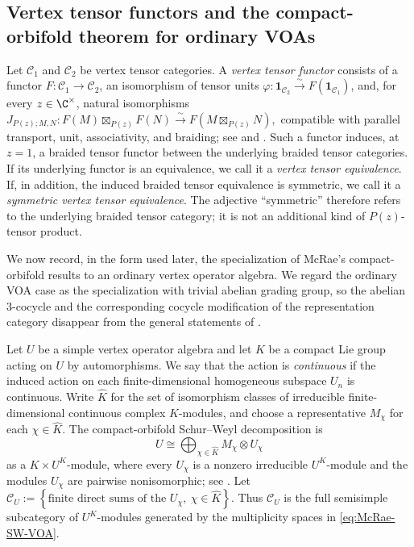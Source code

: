 \documentclass[12pt,leqno]{amsart}
\numberwithin{equation}{section} \newtheorem{thm}{Theorem}[section] \newtheorem{lem}[thm]{Lemma} \newtheorem{ex}[thm]{Example} \newtheorem{prop}[thm]{Proposition} \newtheorem{cor}[thm]{Corollary} \newtheorem{defi}[thm]{Definition} \newtheorem{rmk}[thm]{Remark} \newtheorem{notation}[thm]{Notation}
\begin{document}
\subsection{Vertex tensor functors and the compact-orbifold theorem for ordinary VOAs}
\label{subsec:McRae-VOA}

Let $\mathcal C_1$ and $\mathcal C_2$ be vertex tensor categories. A \emph{vertex tensor functor} consists of a functor $F:\mathcal C_1\to\mathcal C_2$, an isomorphism of tensor units \(\varphi:\mathbf 1_{\mathcal C_2}\overset{\sim}{\longrightarrow}F(\mathbf 1_{\mathcal C_1})\), and, for every $z\in\C^\times$, natural isomorphisms \(J_{P(z);M,N}:F(M)\boxtimes_{P(z)}F(N)\overset{\sim}{\longrightarrow}F(M\boxtimes_{P(z)}N),\) compatible with parallel transport, unit, associativity, and braiding; see \cite[\S2.1]{McRae} and \cite[\S3.6]{CKM}. Such a functor induces, at $z=1$, a braided tensor functor between the underlying braided tensor categories. If its underlying functor is an equivalence, we call it a \emph{vertex tensor equivalence}. If, in addition, the induced braided tensor equivalence is symmetric, we call it a \emph{symmetric vertex tensor equivalence}. The adjective ``symmetric'' therefore refers to the underlying braided tensor category; it is not an additional kind of $P(z)$-tensor product.

We now record, in the form used later, the specialization of McRae's compact-orbifold results to an ordinary vertex operator algebra. We regard the ordinary VOA case as the specialization with trivial abelian grading group, so the abelian $3$-cocycle and the corresponding cocycle modification of the representation category disappear from the general statements of \cite{McRae}.

Let $U$ be a simple vertex operator algebra and let $K$ be a compact Lie group acting on $U$ by automorphisms. We say that the action is \emph{continuous} if the induced action on each finite-dimensional homogeneous subspace $U_n$ is continuous. Write $\widehat K$ for the set of isomorphism classes of irreducible finite-dimensional continuous complex $K$-modules, and choose a representative $M_\chi$ for each $\chi\in\widehat K$. The compact-orbifold Schur--Weyl decomposition is
\begin{equation}\label{eq:McRae-SW-VOA}
 U\cong
 \bigoplus_{\chi\in\widehat K}M_\chi\otimes U_\chi
\end{equation}
as a $K\times U^K$-module, where every $U_\chi$ is a nonzero irreducible $U^K$-module and the modules $U_\chi$ are pairwise nonisomorphic; see \cite[\S3.1]{McRae}. Let \(\mathcal C_U:=\left\{\text{finite direct sums of the }U_\chi,\ \chi\in\widehat K\right\}.\) Thus $\mathcal C_U$ is the full semisimple subcategory of $U^K$-modules generated by the multiplicity spaces in \eqref{eq:McRae-SW-VOA}.
\end{document}
